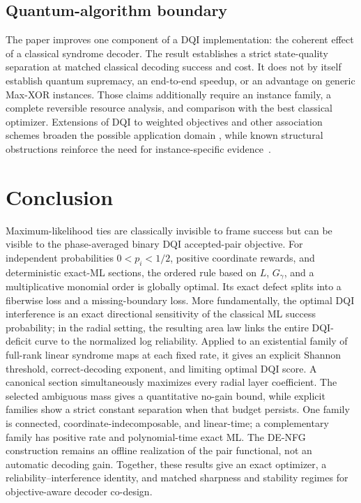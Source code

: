 \documentclass[journal]{IEEEtran}
\theoremstyle{definition}
\theoremstyle{remark}
\begin{document}
\subsection{Quantum-algorithm boundary}

The paper improves one component of a DQI implementation: the coherent effect
of a classical syndrome decoder.  The result establishes a strict state-quality
separation at matched classical decoding success and cost.  It does not by
itself establish quantum supremacy, an end-to-end speedup, or an advantage on
generic Max-XOR instances.  Those claims additionally require an instance
family, a complete reversible resource analysis, and comparison with the best
classical optimizer.  Extensions of DQI to weighted objectives and other
association schemes broaden the possible application domain
\cite{bu2026,krajenbrink2026}, while known structural obstructions reinforce
the need for instance-specific evidence~\cite{anschuetz2025}.

\section{Conclusion}

Maximum-likelihood ties are classically invisible to frame success but can be
visible to the phase-averaged binary DQI accepted-pair objective.  For
independent probabilities $0<p_i<1/2$, positive coordinate rewards, and
deterministic exact-ML sections, the ordered rule based on $L$, $G_\gamma$, and
a multiplicative monomial order is globally optimal.  Its exact defect splits
into a fiberwise loss and a missing-boundary loss.  More fundamentally, the
  optimal DQI interference is an exact directional sensitivity of the classical
  ML success probability; in the radial setting, the resulting area law links
  the entire DQI-deficit curve to the normalized log reliability.  Applied to
  an existential family of full-rank linear syndrome maps at each fixed rate,
  it gives an explicit Shannon threshold,
correct-decoding exponent, and limiting optimal DQI score.  A canonical
section simultaneously maximizes every radial layer coefficient.  The
selected ambiguous mass gives a quantitative no-gain bound, while explicit
families show a strict constant separation when that budget persists.  One
family is connected, coordinate-indecomposable, and linear-time; a
complementary family has positive rate and polynomial-time exact ML.  The
DE-NFG construction remains an offline realization of the pair functional,
not an automatic decoding gain.  Together, these results give an exact
optimizer, a reliability--interference identity, and matched sharpness and
stability regimes for objective-aware decoder co-design.
\end{document}
